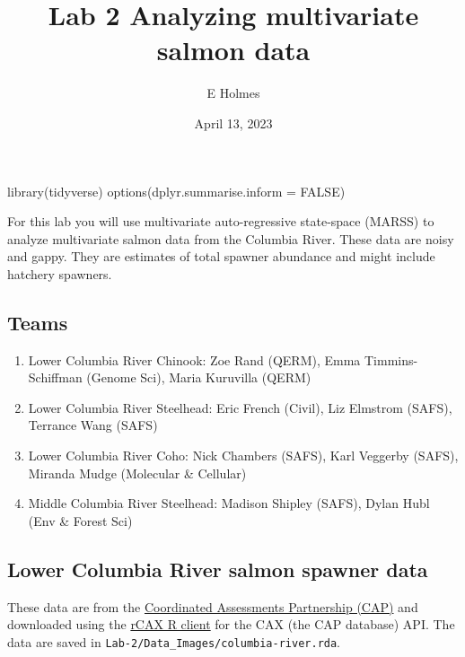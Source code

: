 \documentclass[
]{article}
\title{Lab 2 Analyzing multivariate salmon data}
\author{E Holmes}
\date{April 13, 2023}
\newenvironment{Shaded}{\begin{snugshade}}{\end{snugshade}}
\newcommand{\AttributeTok}[1]{\textcolor[rgb]{0.77,0.63,0.00}{#1}}
\newcommand{\ConstantTok}[1]{\textcolor[rgb]{0.00,0.00,0.00}{#1}}
\newcommand{\FunctionTok}[1]{\textcolor[rgb]{0.00,0.00,0.00}{#1}}
\newcommand{\NormalTok}[1]{#1}
\providecommand{\tightlist}{%
  \setlength{\itemsep}{0pt}\setlength{\parskip}{0pt}}
\begin{document}
\maketitle

{
\setcounter{tocdepth}{2}
\tableofcontents
}
\begin{Shaded}
\begin{Highlighting}[]
\FunctionTok{library}\NormalTok{(tidyverse)}
\FunctionTok{options}\NormalTok{(}\AttributeTok{dplyr.summarise.inform =} \ConstantTok{FALSE}\NormalTok{)}
\end{Highlighting}
\end{Shaded}

For this lab you will use multivariate auto-regressive state-space
(MARSS) to analyze multivariate salmon data from the Columbia River.
These data are noisy and gappy. They are estimates of total spawner
abundance and might include hatchery spawners.

\hypertarget{teams}{%
\subsection{Teams}\label{teams}}

\begin{enumerate}
\def\labelenumi{\arabic{enumi}.}
\tightlist
\item
  Lower Columbia River Chinook: Zoe Rand (QERM), Emma Timmins-Schiffman
  (Genome Sci), Maria Kuruvilla (QERM)
\item
  Lower Columbia River Steelhead: Eric French (Civil), Liz Elmstrom
  (SAFS), Terrance Wang (SAFS)
\item
  Lower Columbia River Coho: Nick Chambers (SAFS), Karl Veggerby (SAFS),
  Miranda Mudge (Molecular \& Cellular)
\item
  Middle Columbia River Steelhead: Madison Shipley (SAFS), Dylan Hubl
  (Env \& Forest Sci)
\end{enumerate}

\hypertarget{lower-columbia-river-salmon-spawner-data}{%
\subsection{Lower Columbia River salmon spawner
data}\label{lower-columbia-river-salmon-spawner-data}}

These data are from the
\href{https://www.streamnet.org/cap/about-cap/}{Coordinated Assessments
Partnership (CAP)} and downloaded using the
\href{https://nwfsc-math-bio.github.io/rCAX/}{rCAX R client} for the CAX
(the CAP database) API. The data are saved in
\texttt{Lab-2/Data\_Images/columbia-river.rda}.
\end{document}

